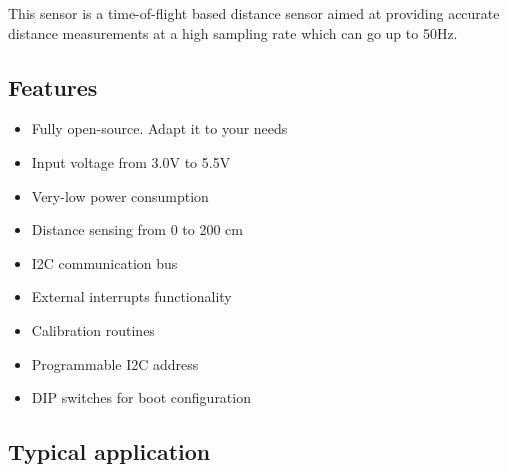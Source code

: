 
\begin{multicols}{2}
	This sensor is a time-of-flight based distance sensor aimed at providing accurate distance measurements at a high sampling rate which can go up to 50Hz.
	\columnbreak
	\subsection{Features}
	\begin{itemize}
		\item Fully open-source. Adapt it to your needs
		\item Input voltage from 3.0V to 5.5V
		\item Very-low power consumption
		\item Distance sensing from 0 to 200 cm
		\item I2C communication bus
		\item External interrupts functionality
		\item Calibration routines
		\item Programmable I2C address
		\item DIP switches for boot configuration
	\end{itemize}
\end{multicols}

\subsection{Typical application}

\begin{figure}
	
\end{figure}